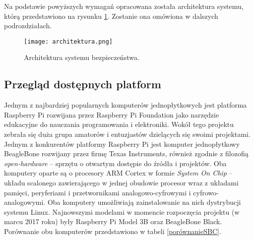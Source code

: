 \documentclass[a4paper,11pt,twoside]{article}
\begin{document}
Na podstawie powyższych wymagań opracowana została architektura systemu, którą przedstawiono na rysunku \ref{fig: architektura}. Zostanie ona omówiona w dalszych podrozdziałach.
\begin{figure}[h]
\texttt{[image: architektura.png]}
\caption{Architektura systemu bezpieczeństwa.}
\label{fig: architektura}
\end{figure}


\subsection{Przegląd dostępnych platform}
Jednym z najbardziej popularnych komputerów jednopłytkowych jest platforma Raspberry Pi rozwijana przez Raspberry Pi Foundation jako narzędzie edukacyjne do nauczania programowania i elektroniki. Wokół tego projektu zebrała się duża grupa amatorów i entuzjastów dzielących się swoimi projektami. Jednym z konkurentów platformy Raspberry Pi jest komputer jednopłytkowy BeagleBone rozwijany przez firmę Texas Instruments, również zgodnie z filozofią \textit{open-hardware} -- sprzętu o otwartym dostępie do źródła i projektów. Oba komputery oparte są o procesory ARM Cortex w formie \textit{System On Chip} -- układu scalonego zawierającego w jednej obudowie procesor wraz z układami pamięci, peryferiami i przetwornikami analogowo-cyfrowymi i cyfrowo-analogowymi. Oba komputery umożliwiają zainstalowanie na nich dystrybucji systemu Linux. Najnowszymi modelami w momencie rozpoczęcia projektu (w marcu 2017 roku) były Raspberry Pi Model 3B oraz BeagleBone Black. Porównanie obu komputerów przedstawiono w tabeli \ref{porównanieSBC}.
\end{document}
